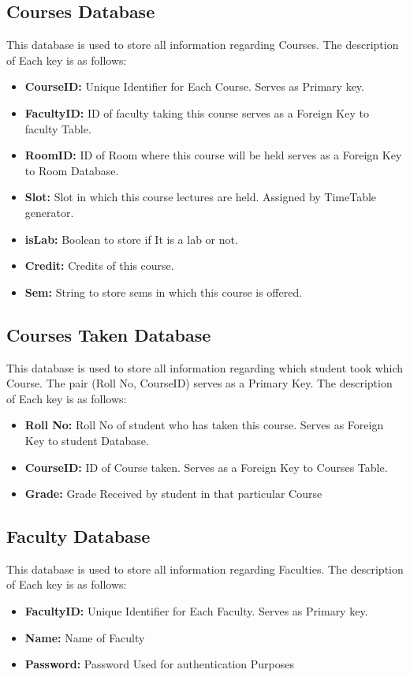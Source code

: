 \documentclass[12pt,a4paper]{article}
\begin{document}
    \subsection{Courses Database}
        This database is used to store all information regarding Courses.  The description of Each key is as follows:
        \begin{itemize}
        \item \textbf{CourseID:} Unique Identifier for Each Course. Serves as Primary key.
        \item  \textbf{FacultyID:} ID of faculty taking this course serves as a Foreign Key to faculty Table.
        \item  \textbf{RoomID:} ID of Room where this course will be held serves as a Foreign Key to Room Database.
        \item  \textbf{Slot:} Slot in which this course lectures are held. Assigned by TimeTable generator.
        \item  \textbf{isLab:} Boolean to store if It is a lab or not.
        \item  \textbf{Credit:} Credits of this course.
        \item  \textbf{Sem:} String to store sems in which this course is offered.
    \end{itemize}
    \subsection{Courses Taken Database}
        This database is used to store all information regarding which student took which Course. The pair (Roll No, CourseID) serves as a Primary Key. The description of Each key is as follows:
        \begin{itemize}
        \item \textbf{Roll No:} Roll No of student who has taken this course. Serves as Foreign Key to student Database.
        \item  \textbf{CourseID:} ID of Course taken. Serves as a Foreign Key to Courses Table.
        \item  \textbf{Grade:} Grade Received by student in that particular Course
    \end{itemize}
    \subsection{Faculty Database}
        This database is used to store all information regarding Faculties.  The description of Each key is as follows:
        \begin{itemize}
       \item \textbf{FacultyID:} Unique Identifier for Each Faculty. Serves as Primary key.
        \item  \textbf{Name:} Name of Faculty
        \item  \textbf{Password:} Password Used for authentication Purposes
    \end{itemize}
\end{document}
